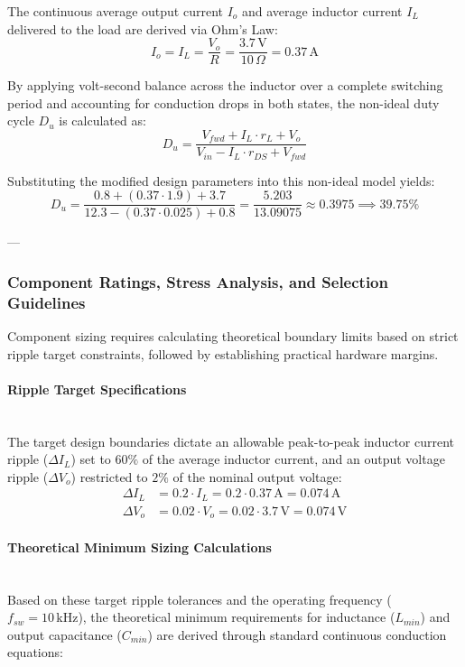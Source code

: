 The continuous average output current $I_o$ and average inductor current $I_L$ delivered to the load are derived via Ohm's Law:
\begin{equation}
I_o = I_L = \frac{V_o}{R} = \frac{3.7\,\text{V}}{10\,\Omega} = 0.37\,\text{A}
\end{equation}

By applying volt-second balance across the inductor over a complete switching period and accounting for conduction drops in both states, the non-ideal duty cycle $D_u$ is calculated as:
\begin{equation}
D_u = \frac{V_{fwd} + I_L \cdot r_L + V_o}{V_{in} - I_L \cdot r_{DS} + V_{fwd}}
\end{equation}

Substituting the modified design parameters into this non-ideal model yields:
\begin{equation}
D_u = \frac{0.8 + (0.37 \cdot 1.9) + 3.7}{12.3 - (0.37 \cdot 0.025) + 0.8} = \frac{5.203}{13.09075} \approx 0.3975 \implies 39.75\%
\end{equation}

---

\subsubsection{Component Ratings, Stress Analysis, and Selection Guidelines}
Component sizing requires calculating theoretical boundary limits based on strict ripple target constraints, followed by establishing practical hardware margins.

\paragraph{Ripple Target Specifications}~\hfill\\
The target design boundaries dictate an allowable peak-to-peak inductor current ripple ($\Delta I_L$) set to $60\%$ of the average inductor current, and an output voltage ripple ($\Delta V_o$) restricted to $2\%$ of the nominal output voltage:
\begin{align*}
\Delta I_L &= 0.2 \cdot I_L = 0.2 \cdot 0.37\,\text{A} = 0.074\,\text{A} \\
\Delta V_o &= 0.02 \cdot V_o = 0.02 \cdot 3.7\,\text{V} = 0.074\,\text{V}
\end{align*}

\paragraph{Theoretical Minimum Sizing Calculations}~\hfill\\
Based on these target ripple tolerances and the operating frequency ($f_{sw} = 10\,\text{kHz}$), the theoretical minimum requirements for inductance ($L_{min}$) and output capacitance ($C_{min}$) are derived through standard continuous conduction equations:

